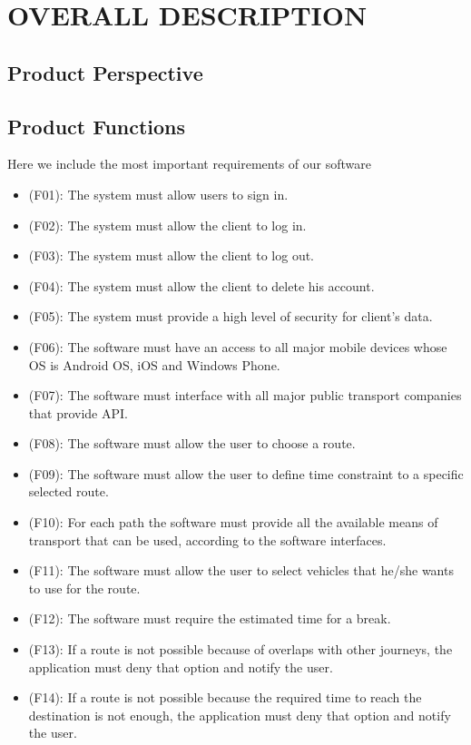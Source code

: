 \documentclass[a4paper,leqno]{book}
\begin{document}
\chapter{OVERALL DESCRIPTION}
\section{Product Perspective}


\section{Product Functions}
Here we include the most important requirements of our software

\begin{itemize}
	
	\item (F01): The system must allow users to sign in.
	\item (F02): The system must allow the client to log in.
	\item (F03): The system must allow the client to log out.
	\item (F04): The system must allow the client to delete his account.
	\item (F05): The system must provide a high level of security for client's data.
	\item (F06): The software must have an access to all major mobile devices whose OS is Android OS, iOS and Windows Phone.
	\item (F07): The software must interface with all major public transport companies that provide API.
	\item (F08): The software must allow the user to choose a route.
	\item (F09): The software must allow the user to define time constraint to a specific selected route.
	\item (F10): For each path the software must provide all the available means of transport that can be used, according to the software interfaces.
	\item (F11): The software must allow the user to select vehicles that he/she wants to use for the route.
	\item (F12): The software must require the estimated time for a break.
	\item (F13): If a route is not possible because of overlaps with other journeys, the application must deny that option and notify the user.
	\item (F14): If a route is not possible because the required time to reach the destination is not enough, the application must deny that option and notify the user.

\end{itemize}
\end{document}

